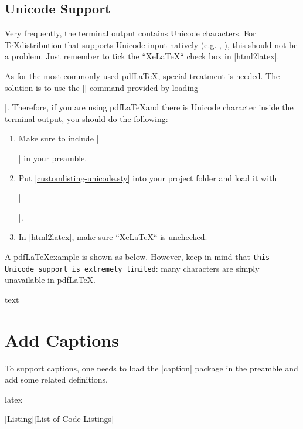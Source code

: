 \documentclass[letterpaper, 11pt, DIV=11]{scrartcl}
\begin{document}
\subsection{Unicode Support}

Very frequently, the terminal output contains Unicode characters. For \TeX distribution that supports Unicode input natively (e.g. \XeLaTeX, \LuaLaTeX), this should not be a problem. Just remember to tick the ``XeLaTeX`` check box in \rawinline|html2latex|.


As for the most commonly used pdf\LaTeX, special treatment is needed. The solution is to use the \texinline|\unichar| command provided by loading \texinline|\usepackage[utf8x]{inputenc}|. Therefore, if you are using pdf\LaTeX and there is Unicode character inside the terminal output, you should do the following:

\begin{enumerate}
\item Make sure to include \texinline|\usepackage[utf8x]{inputenc}| in your preamble.
\item Put \href{https://github.com/xziyue/latex-beautiful-listings-screenshot/blob/master/customlisting-unicode.sty}{\rawinline|customlisting-unicode.sty|} into your project folder and load it with 

\texinline|\usepackage{customlisting-unicode}|.
\item In \rawinline|html2latex|, make sure ``XeLaTeX`` is unchecked.
\end{enumerate}

A pdf\LaTeX example is shown as below. However, keep in mind that \texttt{this Unicode support is extremely limited}: many characters are simply unavailable in pdf\LaTeX.

\begin{tcbsrccode}{text}

\end{tcbsrccode}



\section{Add Captions}

To support captions, one needs to load the \rawinline|caption| package in the preamble and add some related definitions. 

\begin{tcbsrccode}{latex}
\usepackage{caption}

\newenvironment{mylisting}{\medskip\captionsetup{type=listing, labelsep=space}}{\medskip}
[Listing][List of Code Listings]
\end{tcbsrccode}
\end{document}
